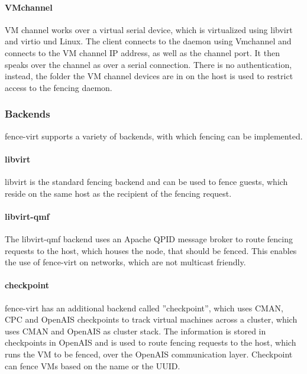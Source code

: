 \paragraph{VMchannel}
VM channel works over a virtual serial device, which is virtualized using libvirt and
virtio und Linux.
The client connects to the daemon using Vmchannel and connects to the VM channel IP address,
as well as the channel port. It then speaks over the channel as over a serial connection.
There is no authentication, instead, the folder the VM channel devices are in on the host
is used to restrict access to the fencing daemon.

\subsubsection{Backends}
fence-virt supports a variety of backends, with which fencing can be implemented.
\paragraph{libvirt}
libvirt is the standard fencing backend and can be used to fence guests, which
reside on the same host as the recipient of the fencing request.
\paragraph{libvirt-qmf}
The libvirt-qmf backend uses an Apache QPID message broker to route fencing
requests to the host, which houses the node, that should be fenced. This
enables the use of fence-virt on networks, which are not multicast friendly.
\paragraph{checkpoint}
fence-virt has an additional backend called ''checkpoint'', which uses
CMAN, CPC and OpenAIS checkpoints to track virtual machines across a cluster, which
uses CMAN and OpenAIS as cluster stack. The information is stored in checkpoints
in OpenAIS and is used to route fencing requests to the host, which runs the \ac{VM}
to be fenced, over the OpenAIS communication layer.
Checkpoint can fence \acp{VM} based on the name or the UUID.

